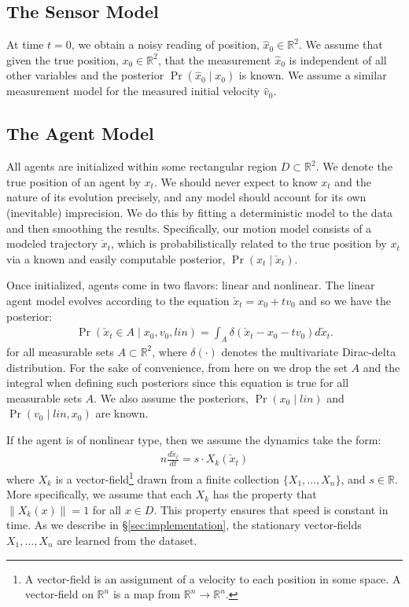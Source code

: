 \documentclass[letterpaper,10pt,conference]{ieeeconf}
\begin{document}
\subsection{The Sensor Model}
At time $t=0$, we obtain a noisy reading of position, $\hat{x}_0 \in \mathbb{R}^2$.
We assume that given the true position, $x_0 \in \mathbb{R}^2$, that the measurement $\hat{x}_0$ is independent of all other variables and the posterior $\Pr( \hat{x}_0 \mid x_0)$ is known.
We assume a similar measurement model for the measured initial velocity $\hat{v}_0$.

\subsection{The Agent Model}
All agents are initialized within some rectangular region $D \subset \mathbb{R}^2$.
We denote the true position of an agent by $x_t$.
We should never expect to know $x_t$ and the nature of its evolution precisely, and any model should account for its own (inevitable) imprecision.
We do this by fitting a deterministic model to the data and then smoothing the results.
Specifically, our motion model consists of a modeled trajectory $\check{x}_t$, which is probabilistically related to the true position by $x_t$ via a known and easily computable posterior, $\Pr(x_t \mid \check{x}_t)$.

Once initialized, agents come in two flavors: linear and nonlinear.
The linear agent model evolves according to the equation $\check{x}_t = x_0 + t v_0$ and so we have the posterior:
\begin{align}
	\Pr( \check{x}_t  \in A \mid x_0, v_0, lin) = \int_A \delta( \check{x}_t - x_0 - t v_0 ) d\check{x}_t.
\end{align}
for all measurable sets $A \subset \mathbb{R}^2$, where $\delta( \cdot )$ denotes the multivariate Dirac-delta distribution.
For the sake of convenience, from here on we drop the set $A$ and the integral when defining such posteriors since this equation is true for all measurable sets $A$.
We also assume the posteriors, $\Pr(x_0 \mid lin)$ and $\Pr( v_0 \mid lin, x_0)$ are known.

If the agent is of nonlinear type, then we assume the dynamics take the form:
\begin{align}n
	\frac{d \check{x}_t}{dt} = s \cdot X_k(\check{x}_t) \label{eq:ode}
\end{align}
where $X_k$ is a vector-field\footnote{A vector-field is an assignment of a velocity to each position in some space.  A vector-field on $\mathbb{R}^n$ is a map from $\mathbb{R}^n \to \mathbb{R}^n$.} drawn from a finite collection $\{X_1, \dots, X_n\}$, and $s \in \mathbb{R}$.
More specifically, we assume that each $X_k$ has the property that $\| X_k(x) \| = 1$ for all $x \in D$.
This property ensures that speed is constant in time.
As we describe in \S \ref{sec:implementation}, the stationary vector-fields $X_1,\dots,X_n$ are learned from the dataset.
\end{document}
